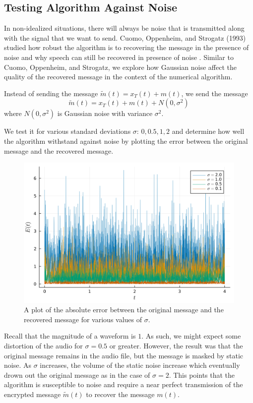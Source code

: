 \documentclass[12pt]{article}
\begin{document}
    \subsection{Testing Algorithm Against Noise}
    In non-idealized situations, there will always be noise that is transmitted along with the signal that we want to send. Cuomo, Oppenheim, and Strogatz (1993) studied how robust the algorithm is to recovering the message in the presence of noise and why speech can still be recovered in presence of noise \cite{chaoticnoise}. Similar to Cuomo, Oppenheim, and Strogatz, we explore how Gaussian noise affect the quality of the recovered message in the context of the numerical algorithm. 

    Instead of sending the message $\tilde{m}(t) = x_T (t) + m(t)$, we send the message 
    \begin{equation*} 
      \tilde{m}(t) = x_T (t) + m(t) + N(0,\sigma^2)
    \end{equation*}
    where $N(0,\sigma^2)$ is Gaussian noise with variance $\sigma^2$. 

    We test it for various standard deviations $\sigma$: $0, 0.5, 1, 2$ and determine how well the algorithm withstand against noise by plotting the error between the original message and the recovered message. 
    \begin{figure}[H]
        \includegraphics[width=\linewidth]{error_plot_noise.png}
        \centering
        \caption{A plot of the absolute error between the original message and the recovered message for various values of $\sigma$.}
    \end{figure}
    Recall that the magnitude of a waveform is $1$. As such, we might expect some distortion of the audio for $\sigma = 0.5$ or greater. However, the result was that the original message remains in the audio file, but the message is masked by static noise. As $\sigma$ increases, the volume of the static noise increase which eventually drown out the original message as in the case of $\sigma = 2$. This points that the algorithm is susceptible to noise and require a near perfect transmission of the encrypted message $\widetilde{m}(t)$ to recover the message $m(t)$. 
\end{document}
